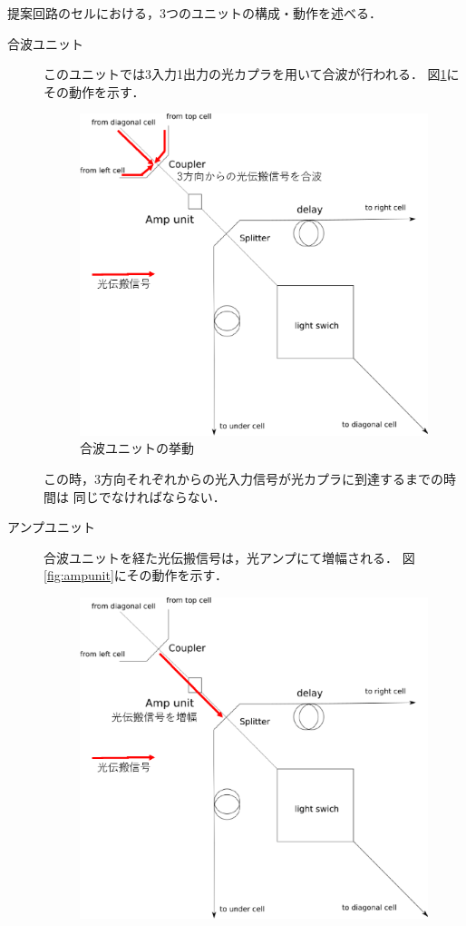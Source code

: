 提案回路のセルにおける，3つのユニットの構成・動作を述べる．
\begin{description}
\item[合波ユニット]
このユニットでは3入力1出力の光カプラを用いて合波が行われる．
図\ref{fig:couplerunit}にその動作を示す．
\begin{figure}[t!]
\begin{center}
\includegraphics[keepaspectratio,scale=0.4]{fig/3/lightracelogic_cell_6_1.eps}
\caption{合波ユニットの挙動}
\label{fig:couplerunit}
\end{center}
\end{figure}
この時，3方向それぞれからの光入力信号が光カプラに到達するまでの時間は
同じでなければならない．
\item[アンプユニット]
合波ユニットを経た光伝搬信号は，光アンプにて増幅される．
図\ref{fig:ampunit}にその動作を示す．
\begin{figure}[t!]
\begin{center}
\includegraphics[keepaspectratio,scale=0.4]{fig/3/lightracelogic_cell_6_2.eps}

\end{center}
\end{figure}
\end{description}
